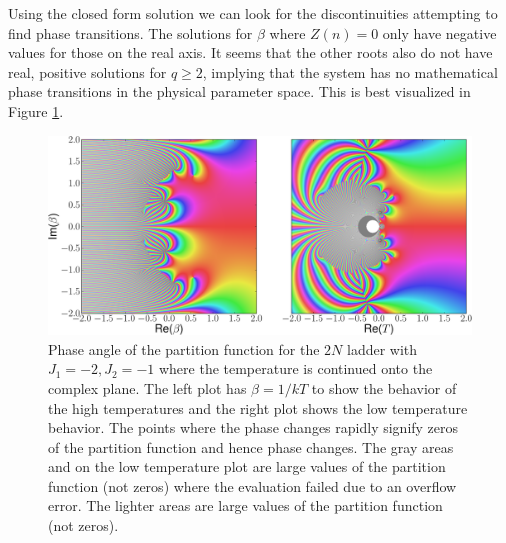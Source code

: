 Using the closed form solution we can look for the discontinuities attempting to find phase transitions. The solutions for $\beta$ where $Z(n)=0$ only have negative values for those on the real axis. It seems that the other roots also do not have real, positive solutions for $q \geq 2$, implying that the system has no mathematical phase transitions in the physical parameter space. This is best visualized in Figure \ref{fig:zeros_par_func_2nladder}.
%
\begin{figure}[hb]
\includegraphics[width=\textwidth]{pictures/aggregation_model/pictures/zeros_parition_func_2N_ladder_2.pdf}
\caption{Phase angle of the partition function for the $2N$ ladder with $J_1=-2, J_2=-1$ where the temperature is continued onto the complex plane. The left plot has $\beta=1/kT$ to show the behavior of the high temperatures and the right plot shows the low temperature behavior. The points where the phase changes rapidly signify zeros of the partition function and hence phase changes. The gray areas and on the low temperature plot are large values of the partition function (not zeros) where the evaluation failed due to an overflow error. The lighter areas are large values of the partition function (not zeros).
}
\label{fig:zeros_par_func_2nladder}
\end{figure}

